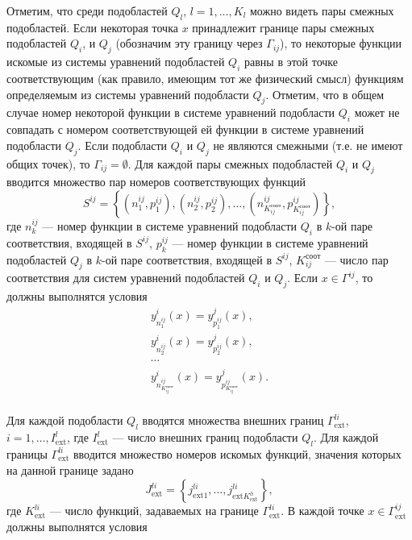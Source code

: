 \documentclass[a4paper,12pt]{article}
\begin{document}
Отметим, что среди подобластей $Q_l$, $l=1,\ldots,K_l$ можно видеть пары
смежных подобластей. Если некоторая точка $x$ принадлежит границе пары
смежных подобластей $Q_i$, и $Q_j$ (обозначим эту границу через
$\Gamma_{ij}$), то некоторые функции искомые из системы уравнений
подобластей $Q_i$ равны в этой точке соответствующим (как правило,
имеющим тот же физический смысл) функциям определяемым из системы
уравнений подобласти $Q_j$. Отметим, что в общем случае номер
некоторой функции в системе уравнений подобласти $Q_i$ может не
совпадать с номером соответствующей ей функции в системе уравнений
подобласти $Q_j$. Если подобласти $Q_i$ и $Q_j$ не являются смежными
(т.е. не имеют общих точек), то $\Gamma_{ij} = \emptyset$. Для каждой
пары смежных подобластей $Q_i$ и $Q_j$ вводится множество пар номеров
соответствующих функций
\begin{equation}
    S^{ij}=\left\{(n^{ij}_1,p^{ij}_1),(n^{ij}_2,p^{ij}_2),
    \ldots,(n^{ij}_{K^{соот}_{ij}},p^{ij}_{K^{соот}_{ij}})\right\},
    \label{set-nums}
\end{equation}
где $n^{ij}_k$ --- номер функции в системе уравнений подобласти $Q_i$
в $k$-ой паре соответствия, входящей в $S^{ij}$, $p^{ij}_k$ --- номер 
функции в системе уравнений подобластей $Q_j$ в $k$-ой паре соответствия,
входящей в $S^{ij}$, $K^{соот}_{ij}$ --- число пар соответствия для 
систем уравнений подобластей $Q_i$ и $Q_j$. Если $x \in
\Gamma^{ij}$, то должны выполнятся условия
\begin{equation}
    \begin{array}{ll}
        y^i_{n^{ij}_1}(x)=y^j_{p^{ij}_1}(x),\\
        y^i_{n^{ij}_2}(x)=y^j_{p^{ij}_2}(x),\\
        \cdots \\
        y^i_{n^{ij}_{K^{соот}_{ij}}}(x)=
        y^j_{p^{ij}_{K^{соот}_{ij}}}(x).\\
    \end{array}
    \label{boundary}
\end{equation}

Для каждой подобласти $Q_l$ вводятся множества внешних границ
$\Gamma^{li}_{\text{ext}}$, $i=1,\ldots,I^{l}_{\text{ext}}$, где
$I^l_{\text{ext}}$ --- число внешних границ подобласти $Q_l$. Для
каждой границы $\Gamma^{li}_{\text{ext}}$ вводится множество номеров
искомых функций, значения которых на данной границе задано
$$J^{li}_{\text{ext}}=\left\{j^{li}_{\text{ext} 1},\ldots,
j^{li}_{\text{ext} K^{li}_{\text{ext}}}\right\},$$ где
$K^{li}_{\text{ext}}$ --- число функций, задаваемых на границе
$\Gamma^{li}_{\text{ext}}$. В каждой точке $x \in
\Gamma^{ij}_{\text{ext}}$ должны выполнятся условия
\end{document}
